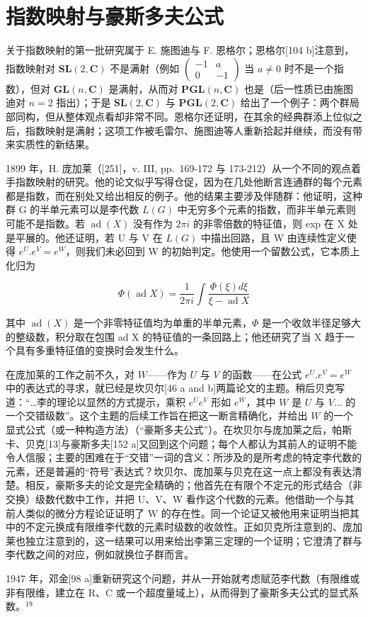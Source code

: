 \section{指数映射与豪斯多夫公式}

关于指数映射的第一批研究属于 E. 施图迪与 F. 恩格尔；恩格尔{[}104 b{]}注意到，指数映射对 \(\mathbf{SL}(2, \mathbf{C})\) 不是满射（例如 \(\left( \begin{array}{cc} -1 & a \\ 0 & -1 \end{array} \right)\) 当 \(a \neq 0\) 时不是一个指数），但对 \(\mathbf{GL}(n, \mathbf{C})\) 是满射，从而对 \(\mathbf{PGL}(n, \mathbf{C})\) 也是（后一性质已由施图迪对 \(n = 2\) 指出）；于是 \(\mathbf{SL}(2, \mathbf{C})\) 与 \(\mathbf{PGL}(2, \mathbf{C})\) 给出了一个例子：两个群局部同构，但从整体观点看却非常不同。恩格尔还证明，在其余的经典群添上位似之后，指数映射是满射；这项工作被毛雷尔、施图迪等人重新拾起并继续，而没有带来实质性的新结果。

1899 年，H. 庞加莱（{[}251{]}，v. III, pp.~169-172 与 173-212）从一个不同的观点着手指数映射的研究。他的论文似乎写得仓促，因为在几处他断言连通群的每个元素都是指数，而在别处又给出相反的例子。他的结果主要涉及伴随群：他证明，这种群 G 的半单元素可以是李代数 \(L(G)\) 中无穷多个元素的指数，而非半单元素则可能不是指数。若 \(\operatorname{ad}(X)\) 没有作为 \(2\pi i\) 的非零倍数的特征值，则 exp 在 X 处是平展的。他还证明，若 U 与 V 在 \(L(G)\) 中描出回路，且 W 由连续性定义使得 \(e^{U}.e^{V}=e^{W}\)，则我们未必回到 W 的初始判定。他使用一个留数公式，它本质上化归为

\[
\Phi (\operatorname{ad} X) = \frac {1}{2 \pi i} \int \frac {\Phi (\xi) d \xi}{\xi - \operatorname{ad} X}
\]

其中 \(\operatorname{ad}(X)\) 是一个非零特征值均为单重的半单元素，\(\Phi\) 是一个收敛半径足够大的整级数，积分取在包围 ad X 的特征值的一条回路上；他还研究了当 X 趋于一个具有多重特征值的变换时会发生什么。

在庞加莱的工作之前不久，对 \(W\)——作为 \(U\) 与 \(V\) 的函数——在公式 \(e^U.e^V = e^W\) 中的表达式的寻求，就已经是坎贝尔{[}46 a and b{]}两篇论文的主题。稍后贝克写道：“\ldots 李的理论以显然的方式提示，乘积 \(e^Ue^V\) 形如 \(e^W\)，其中 \(W\) 是 \(U\) 与 \(V\ldots\) 的一个交错级数”。这个主题的后续工作旨在把这一断言精确化，并给出 \(W\) 的一个显式公式（或一种构造方法）（“豪斯多夫公式”）。在坎贝尔与庞加莱之后，帕斯卡、贝克{[}13{]}与豪斯多夫{[}152 a{]}又回到这个问题；每个人都认为其前人的证明不能令人信服；主要的困难在于“交错”一词的含义：所涉及的是所考虑的特定李代数的元素，还是普遍的“符号”表达式？坎贝尔、庞加莱与贝克在这一点上都没有表达清楚。相反，豪斯多夫的论文是完全精确的；他首先在有限个不定元的形式结合（非交换）级数代数中工作，并把 U、V、W 看作这个代数的元素。他借助一个与其前人类似的微分方程论证证明了 W 的存在性。同一个论证又被他用来证明当把其中的不定元换成有限维李代数的元素时级数的收敛性。正如贝克所注意到的、庞加莱也独立注意到的，这一结果可以用来给出李第三定理的一个证明；它澄清了群与李代数之间的对应，例如就换位子群而言。

1947 年，邓金{[}98 a{]}重新研究这个问题，并从一开始就考虑赋范李代数（有限维或非有限维，建立在 R、C 或一个超度量域上），从而得到了豪斯多夫公式的显式系数。\(^{19}\)

